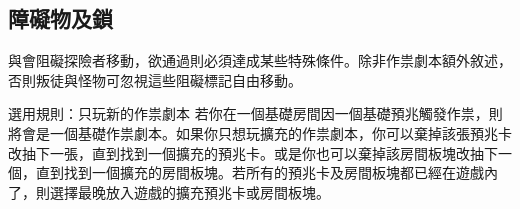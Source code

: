 
\subsection{障礙物及鎖}

與會阻礙探險者移動，欲通過則必須達成某些特殊條件。除非作祟劇本額外敘述，否則叛徒與怪物可忽視這些阻礙標記自由移動。

\begin{RuleBox}{選用規則：只玩新的作祟劇本}
  若你在一個基礎房間因一個基礎預兆觸發作祟，則將會是一個基礎作祟劇本。如果你只想玩擴充的作祟劇本，你可以棄掉該張預兆卡改抽下一張，直到找到一個擴充的預兆卡。或是你也可以棄掉該房間板塊改抽下一個，直到找到一個擴充的房間板塊。若所有的預兆卡及房間板塊都已經在遊戲內了，則選擇最晚放入遊戲的擴充預兆卡或房間板塊。
\end{RuleBox}
